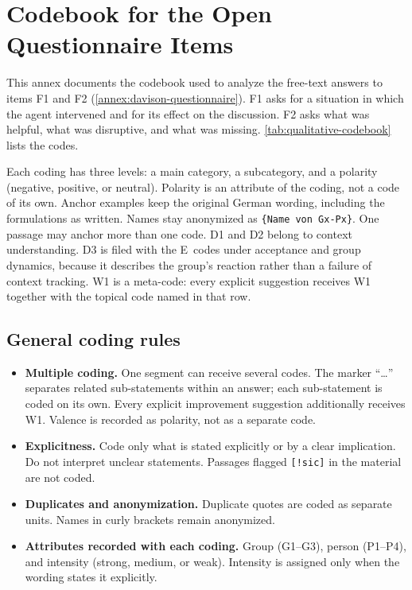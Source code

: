 \section{Codebook for the Open Questionnaire Items}
\label{annex:qualitative-codebook}

This annex documents the codebook used to analyze the free-text answers to
items F1 and F2 (\autoref{annex:davison-questionnaire}).
F1 asks for a situation in which the agent intervened and for its effect on the
discussion.
F2 asks what was helpful, what was disruptive, and what was missing.
\autoref{tab:qualitative-codebook} lists the codes.

Each coding has three levels: a main category, a subcategory, and a polarity
(negative, positive, or neutral).
Polarity is an attribute of the coding, not a code of its own.
Anchor examples keep the original German wording, including the formulations as
written.
Names stay anonymized as \texttt{\{Name von Gx-Px\}}.
One passage may anchor more than one code.
D1 and D2 belong to context understanding.
D3 is filed with the E~codes under acceptance and group dynamics, because it
describes the group's reaction rather than a failure of context tracking.
W1 is a meta-code: every explicit suggestion receives W1 together with the
topical code named in that row.

\subsection*{General coding rules}

\begin{itemize}
  \item \textbf{Multiple coding.}
    One segment can receive several codes.
    The marker \enquote{\ldots} separates related sub-statements within an answer;
    each sub-statement is coded on its own.
    Every explicit improvement suggestion additionally receives W1.
    Valence is recorded as polarity, not as a separate code.
  \item \textbf{Explicitness.}
    Code only what is stated explicitly or by a clear implication.
    Do not interpret unclear statements.
    Passages flagged \texttt{[!sic]} in the material are not coded.
  \item \textbf{Duplicates and anonymization.}
    Duplicate quotes are coded as separate units.
    Names in curly brackets remain anonymized.
  \item \textbf{Attributes recorded with each coding.}
    Group (G1--G3), person (P1--P4), and intensity (strong, medium, or weak).
    Intensity is assigned only when the wording states it explicitly.
\end{itemize}

